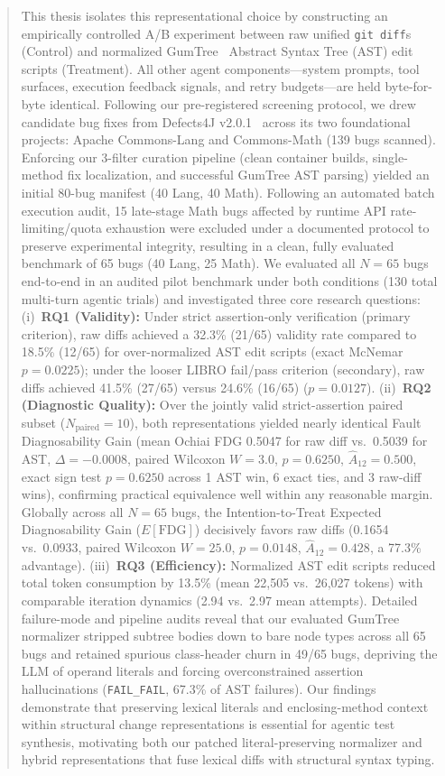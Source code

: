 \documentclass[12pt, a4paper]{article}
\begin{document}
\begin{abstract}
This thesis isolates this representational choice by constructing an empirically controlled A/B experiment between raw unified \texttt{git diff}s (Control) and normalized GumTree~\citep{falleri2014fine} Abstract Syntax Tree (AST) edit scripts (Treatment).
All other agent components---system prompts, tool surfaces, execution feedback signals, and retry budgets---are held byte-for-byte identical.
Following our pre-registered screening protocol, we drew candidate bug fixes from Defects4J v2.0.1~\citep{just2014defects4j} across its two foundational projects: Apache Commons-Lang and Commons-Math (139 bugs scanned).
Enforcing our 3-filter curation pipeline (clean container builds, single-method fix localization, and successful GumTree AST parsing) yielded an initial 80-bug manifest (40 Lang, 40 Math).
Following an automated batch execution audit, 15 late-stage Math bugs affected by runtime API rate-limiting/quota exhaustion were excluded under a documented protocol to preserve experimental integrity, resulting in a clean, fully evaluated benchmark of 65 bugs (40 Lang, 25 Math).
We evaluated all $N=65$ bugs end-to-end in an audited pilot benchmark under both conditions (130 total multi-turn agentic trials) and investigated three core research questions:
(i)~\textbf{RQ1 (Validity):} Under strict assertion-only verification (primary criterion), raw diffs achieved a 32.3\% (21/65) validity rate compared to 18.5\% (12/65) for over-normalized AST edit scripts (exact McNemar $p = 0.0225$); under the looser LIBRO fail/pass criterion (secondary), raw diffs achieved 41.5\% (27/65) versus 24.6\% (16/65) ($p = 0.0127$).
(ii)~\textbf{RQ2 (Diagnostic Quality):} Over the jointly valid strict-assertion paired subset ($N_{\text{paired}} = 10$), both representations yielded nearly identical Fault Diagnosability Gain (mean Ochiai FDG 0.5047 for raw diff vs.\ 0.5039 for AST, $\Delta = -0.0008$, paired Wilcoxon $W = 3.0$, $p = 0.6250$, $\hat{A}_{12} = 0.500$, exact sign test $p = 0.6250$ across 1 AST win, 6 exact ties, and 3 raw-diff wins), confirming practical equivalence well within any reasonable margin. Globally across all $N=65$ bugs, the Intention-to-Treat Expected Diagnosability Gain ($E[\text{FDG}]$) decisively favors raw diffs (0.1654 vs.\ 0.0933, paired Wilcoxon $W = 25.0$, $p = 0.0148$, $\hat{A}_{12} = 0.428$, a 77.3\% advantage).
(iii)~\textbf{RQ3 (Efficiency):} Normalized AST edit scripts reduced total token consumption by 13.5\% (mean 22,505 vs.\ 26,027 tokens) with comparable iteration dynamics (2.94 vs.\ 2.97 mean attempts).
Detailed failure-mode and pipeline audits reveal that our evaluated GumTree normalizer stripped subtree bodies down to bare node types across all 65 bugs and retained spurious class-header churn in 49/65 bugs, depriving the LLM of operand literals and forcing overconstrained assertion hallucinations (\texttt{FAIL\_FAIL}, 67.3\% of AST failures).
Our findings demonstrate that preserving lexical literals and enclosing-method context within structural change representations is essential for agentic test synthesis, motivating both our patched literal-preserving normalizer and hybrid representations that fuse lexical diffs with structural syntax typing.
\end{abstract}
\end{document}
